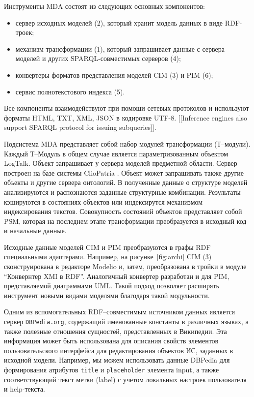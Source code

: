 \documentclass[conference]{IEEEtran} \IEEEoverridecommandlockouts
\begin{document}
Инструменты MDA состоят из следующих основных компонентов: \begin{itemize} \item сервер исходных моделей (2), который хранит модель данных в виде RDF-троек; \item механизм трансформации (1), который запрашивает данные с сервера моделей и других SPARQL-совместимых серверов (4); \item конвертеры форматов представления моделей CIM (3) и PIM (6); \item сервис полнотекстового индекса (5). \end{itemize} 

Все компоненты взаимодействуют при помощи сетевых протоколов и используют форматы HTML, TXT, XML, JSON в кодировке UTF-8. [[Inference engines also support SPARQL protocol for issuing subqueries]]. 

Подсистема MDA представляет собой набор модулей трансформации (Т--модули). Каждый Т--Модуль в общем случае является параметризованным объектом LogTalk. Объект запрашивает у сервера моделей предметной области.  Сервер построен на базе системы ClioPatria \cite{Clio}.  Объект может запрашивать также другие объекты и другие сервера онтологий. В полученные данные о структуре моделей анализируются и распознаются заданные структурные комбинации.  Результаты кэшируются в состояниях объектов или индексирутся механизмом индексирования текстов. Совокупность состояний объектов представляет собой PSM, которая на последнем этапе трансформации преобразуется в исходный код и начальные данные. 

Исходные данные моделей CIM и PIM преобразуются в графы RDF специальными адаптерами. Например, на рисунке~\ref{fig:archi} CIM (3) сконструирована в редакторе Modelio \cite{modelio} и,  затем, преобразована в тройки в модуле ``Конвернтер XMI в RDF''. Аналогичный конвертер разработан и для PIM, представляемой диаграммами UML. Такой подход позволяет расширять инструмент новыми видами моделями благодаря такой модульности. 

Одним из вспомогательных RDF--совместимым источником данных является сервер \texttt{DBPedia.org}, содержащий именованные константы в различных языках, а также полезные отношения сущностей, представленных в Википедии. Эта информация может быть использована для описания свойств элементов пользовательского интерфейса для редактирования объектов ИС, заданных в исходной модели. Например, мы можем использовать данные DBPedia для формирования атрибутов \texttt{title} и \texttt{placeholder} элемента input, а также соответствующий текст метки (label) с учетом локальных настроек пользователя и help-текста. 
\end{document}
